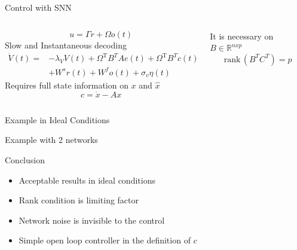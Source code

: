 \documentclass[17pt, t, lualatex]{beamer}
\newcommand{\rank}{\text{rank}\,}
\begin{document}
\begin{frame}{Control with SNN}
	\begin{columns}
		\begin{column}{0.45\textwidth}
			\begin{equation}
				u = \Gamma r + \Omega o(t)
			\end{equation}
			Slow and Instantaneous decoding\\
			\begin{equation}
			\begin{aligned}
			\dot{V}(t)= & -\lambda_V V(t)+\Omega^{\mathrm{T}} B^T A e(t)+\Omega^{\mathrm{T}} B^T c(t) \\
			& +W^s r(t)+W^f o(t)+\sigma_v \eta(t)
			\end{aligned}
			\end{equation}
			Requires full state information on $x$ and $\hat{x}$
			\begin{equation}
				c= \dot{x} - Ax
			\end{equation}
		\end{column}
		\begin{column}{0.45\textwidth}
			It is necessary on $B \in \mathbb{R}^{nxp}$
			\begin{equation}
				\rank(B^TC^T) = p
			\end{equation}
		\end{column}
	\end{columns}
\end{frame}

\begin{frame}{Example in Ideal Conditions}
\end{frame}


\begin{frame}{Example with 2 networks}
\end{frame}

\begin{frame}{Conclusion}
	\pause
	\begin{itemize}
		\setlength\itemsep{1.5em}
		\item Acceptable results in ideal conditions
		\pause
		\item Rank condition is limiting factor
		\pause
		\item Network noise is invisible to the control
		\pause
		\item Simple open loop controller in the definition of $c$
	\end{itemize}
\end{frame}
\end{document}
